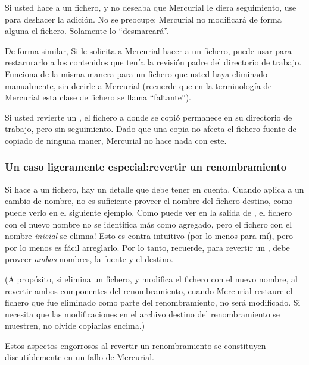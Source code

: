 Si usted hace  a un fichero, y no deseaba que Mercurial le
diera seguimiento, use  para deshacer la adición.  No se
preocupe; Mercurial no modificará de forma alguna el fichero.
Solamente lo ``desmarcará''.

De forma similar, Si le solicita a Mercurial hacer  a un
fichero, puede usar  para restarurarlo a los contenidos
que tenía la revisión padre del directorio de trabajo.
Funciona de la misma manera para un fichero que usted haya eliminado
manualmente, sin decirle a Mercurial (recuerde que en la terminología
de Mercurial esta clase de fichero se llama ``faltante'').

Si usted revierte un , el fichero a donde se copió
permanece en su directorio de trabajo, pero sin seguimiento. Dado que
una copia no afecta el fichero fuente de copiado de ninguna maner,
Mercurial no hace nada con este.

\subsubsection{Un caso ligeramente especial:revertir un renombramiento}

Si hace  a un fichero, hay un detalle que debe tener en
cuenta. Cuando aplica  a un cambio de nombre, no es
suficiente proveer el nombre del fichero destino, como puede verlo en
el siguiente ejemplo.
Como puede ver en la salida de , el fichero con el nuevo
nombre no se identifica más como agregado, pero el fichero con el
nombre-\emph{inicial} se elimna!  Esto es contra-intuitivo (por lo
menos para mí), pero por lo menos es fácil arreglarlo.
Por lo tanto, recuerde, para revertir un , debe proveer
\emph{ambos} nombres, la fuente y el destino.


(A propósito, si elimina un fichero, y modifica el fichero con el
nuevo nombre, al revertir ambos componentes del renombramiento, cuando
Mercurial restaure el fichero que fue eliminado como parte del
renombramiento, no será modificado.
Si necesita que las modificaciones en el archivo destino del
renombramiento se muestren, no olvide copiarlas encima.)

Estos aspectos engorrosos al revertir un renombramiento se constituyen
discutiblemente en un fallo de Mercurial.

